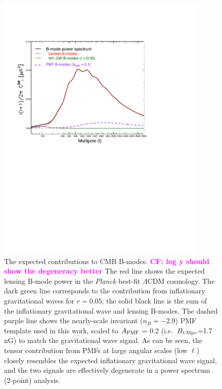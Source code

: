 \documentclass[apj]{emulateapj}
\newcommand{\apmf}{\ensuremath{A_{\rm PMF}}}
\newcommand{\bpmf}{\ensuremath{B_{\rm 1\,Mpc}}}
\newcommand{\lcdm}{\ensuremath{\Lambda}CDM}
\newcommand{\planck}{{\sl Planck}}
\begin{document}
\begin{figure}[htb]\centering
\includegraphics[width=0.9\textwidth,clip,trim={2.cm 12.cm 5cm 4cm}]{pmf_templates.pdf}
  \caption[CMB polarization from PMFs]{
  The expected contributions to CMB B-modes. \textbf{\textcolor{magenta}{CF: log y should show the degeneracy better}}
  The red line shows the expected lensing B-mode power in the \planck{} best-fit \lcdm{} cosmology. 
  The dark green line corresponds to the contribution from inflationary gravitational waves for $r=0.05$; the solid black line is the sum of the inflationary gravitational wave and lensing B-modes. 
  The dashed purple line shows the nearly-scale invariant ($n_B=-2.9$) PMF template used in this work, scaled to \apmf{} = 0.2 (i.e.~\bpmf{}=1.7\,nG) to match the gravitational wave signal. 
  As can be seen, the tensor contribution from PMFs at large angular scales (low $\ell$) closely resembles the expected inflationary gravitational wave signal, and the two signals are effectively degenerate in a power spectrum (2-point) analysis.
      \label{fig:pmf-bb}
  }
\end{figure}
\end{document}
